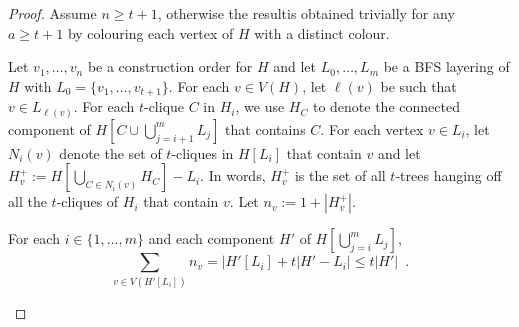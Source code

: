 \documentclass[kpfonts]{patmorin}
\theoremstyle{named}
\begin{document}
\begin{proof}
    Assume $n\ge t+1$, otherwise the resultis  obtained trivially for any $a\ge t+1$ by colouring each vertex of $H$ with a distinct colour.




    Let $v_1,\ldots,v_n$ be a construction order for $H$ and let $L_0,\ldots,L_m$ be a BFS layering of $H$ with $L_0=\{v_1,\ldots,v_{t+1}\}$.
    For each $v\in V(H)$, let $\ell(v)$ be such that $v\in L_{\ell(v)}$.
    For each $t$-clique $C$ in $H_i$, we use $H_C$ to denote the connected component of $H[C\cup\bigcup_{j=i+1}^m L_j]$ that contains $C$.
    For each vertex $v\in L_i$, let $N_i(v)$ denote the set of $t$-cliques in $H[L_i]$ that contain $v$ and let $H^+_v:=H[\bigcup_{C\in N_i(v)} H_C]-L_i$.  In words, $H^+_v$ is the set of all $t$-trees hanging off all the $t$-cliques of $H_i$ that contain $v$.  Let $n_v:=1+|H^+_v|$.

    \begin{clm}\label{size-claim}
        For each $i\in\{1,\ldots,m\}$ and each component $H'$ of $H[\bigcup_{j=i}^m L_j]$,
        \[
            \sum_{v\in V(H'[L_i])} n_v = |H'[L_i] + t|H'-L_i|
            \le t|H'| \enspace .
        \]
    \end{clm}


\end{proof}
\end{document}

